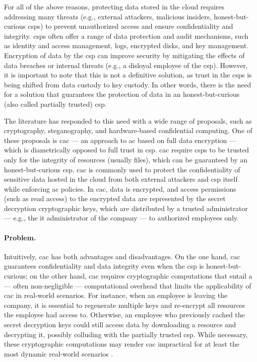 For all of the above reasons, protecting data stored in the cloud requires addressing many threats (e.g., external attackers, malicious insiders, honest-but-curious \glspl{csp}) to prevent unauthorized access and ensure confidentiality and integrity. \glspl{csp} often offer a range of data protection and audit mechanisms, such as identity and access management, logs, encrypted disks, and key management. Encryption of data by the \gls{csp} can improve security by mitigating the effects of data breaches or internal threats (e.g., a disloyal employee of the \gls{csp}). However, it is important to note that this is not a definitive solution, as trust in the \glspl{csp} is being shifted from data custody to key custody. In other words, there is the need for a solution that guarantees the protection of data in an honest-but-curious (also called partially trusted) \gls{csp}.

The literature has responded to this need with a wide range of proposals, such as cryptography, steganography, and hardware-based confidential computing. One of these proposals is \gls{cac} --- an approach to \gls{ac} based on full data encryption --- which is diametrically opposed to full trust in \gls{csp}. \gls{cac} require \glspl{csp} to be trusted only for the integrity of resources (usually files), which can be guaranteed by an honest-but-curious \gls{csp}. \gls{cac} is commonly used to protect the confidentiality of sensitive data hosted in the cloud from both external attackers and \gls{csp} itself while enforcing \gls{ac} policies. In \gls{cac}, data is encrypted, and access permissions (such as read access) to the encrypted data are represented by the secret decryption cryptographic keys, which are distributed by a trusted administrator --- e.g., the \gls{it} administrator of the company --- to authorized employees only.


\paragraph{Problem.} Intuitively, \gls{cac} has both advantages and disadvantages. On the one hand, \gls{cac} guarantees confidentiality and data integrity even when the \gls{csp} is honest-but-curious; on the other hand, \gls{cac} requires cryptographic computations that entail a --- often non-negligible --- computational overhead that limits the applicability of \gls{cac} in real-world scenarios. For instance, when an employee is leaving the company, it is essential to regenerate multiple keys and re-encrypt all resources the employee had access to. Otherwise, an employee who previously cached the secret decryption keys could still access data by downloading a resource and decrypting it, possibly colluding with the partially trusted \gls{csp}. While necessary, these cryptographic computations may render \gls{cac} impractical for at least the most dynamic real-world scenarios  \cite{cac}.

